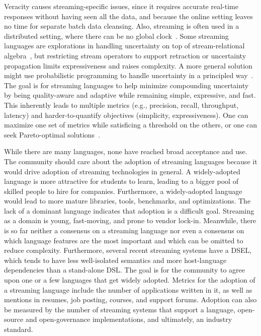 Veracity causes streaming-specific issues, since it requires accurate
real-time responses without having seen all the data, and because the
online setting leaves no time for separate batch data cleansing. Also,
streaming is often used in a distributed setting, where there can be
no global clock~\cite{lamport_1978}. Some streaming languages are
explorations in handling uncertainty on top of stream-relational
algebra~\cite{tran_et_al_2010}, but restricting stream
operators to support retraction or uncertainty propagation limits
expressiveness and raises complexity. A more general solution might use
probabilistic programming to handle uncertainty in a principled
way~\cite{gordon_et_al_2014}. The goal is for streaming languages to help minimize compounding
uncertainty by being quality-aware and adaptive while remaining
simple, expressive, and fast. This inherently leads to multiple
metrics (e.g., precision, recall, throughput, latency) and
harder-to-quantify objectives (simplicity, expressiveness). One can
maximize one set of metrics while satisficing a threshold on the
others, or one can seek Pareto-optimal
solutions~\cite{zhang_hirzel_grove_2016}.

 While
there are many languages, none have reached broad acceptance and use.
The community should care about the adoption of streaming languages
because it would drive adoption of streaming technologies in general.
A widely-adopted language is more attractive for students to learn,
leading to a bigger pool of skilled people to hire for companies.
Furthermore, a widely-adopted language would lead to more
mature libraries, tools, benchmarks, and optimizations. The lack of a
dominant language indicates that adoption is a difficult goal. Streaming as a domain is young, fast-moving, and prone to vendor
lock-in. Meanwhile, there is so far neither a consensus on a
streaming language nor even a consensus on which language
features are the most important and which can be omitted to reduce
complexity. Furthermore, several recent streaming systems have a DSEL,
which tends to have less well-isolated semantics and more
host-language dependencies than a stand-alone DSL. The goal is for the community to agree upon one or a few languages that get
widely adopted. Metrics for the adoption of a streaming language include
the number of applications written in it,
as well as mentions in resumes, job posting, courses, and support
forums. Adoption can also be measured by the number of streaming systems that
support a language, open-source and open-governance implementations,
and ultimately, an industry standard.
\iffalse
We hope this summary of our working group discussion helps guide
future streaming-language research in novel and impactful directions.
\fi 
